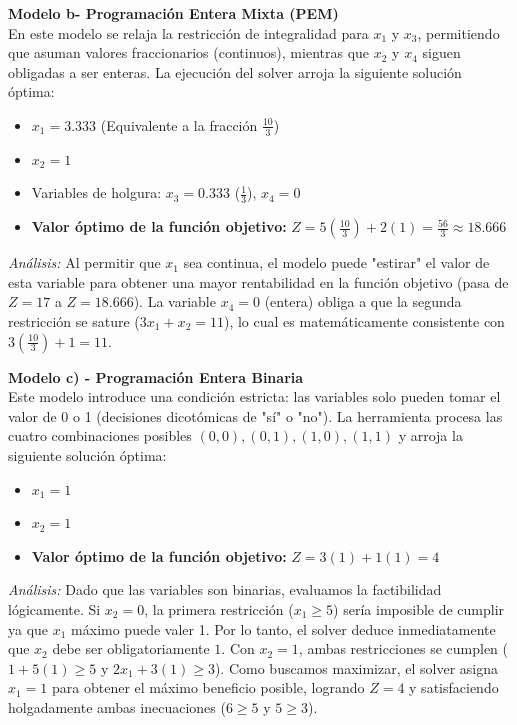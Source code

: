\documentclass[10pt,a4paper]{article}
\begin{document}
\vspace{0.4cm}
\textbf{Modelo b- Programación Entera Mixta (PEM)}\\
En este modelo se relaja la restricción de integralidad para $x_1$ y $x_3$, permitiendo que asuman valores fraccionarios (continuos), mientras que $x_2$ y $x_4$ siguen obligadas a ser enteras. La ejecución del solver arroja la siguiente solución óptima:
\begin{itemize}
    \item $x_1 = 3.333$ (Equivalente a la fracción $\frac{10}{3}$)
    \item $x_2 = 1$
    \item Variables de holgura: $x_3 = 0.333$ ($\frac{1}{3}$), $x_4 = 0$
    \item \textbf{Valor óptimo de la función objetivo:} $Z = 5(\frac{10}{3}) + 2(1) = \frac{56}{3} \approx 18.666$
\end{itemize}
\textit{Análisis:} Al permitir que $x_1$ sea continua, el modelo puede "estirar" el valor de esta variable para obtener una mayor rentabilidad en la función objetivo (pasa de $Z=17$ a $Z=18.666$). La variable $x_4 = 0$ (entera) obliga a que la segunda restricción se sature ($3x_1 + x_2 = 11$), lo cual es matemáticamente consistente con $3(\frac{10}{3}) + 1 = 11$.

\vspace{0.4cm}
\textbf{Modelo c) - Programación Entera Binaria}\\
Este modelo introduce una condición estricta: las variables solo pueden tomar el valor de 0 o 1 (decisiones dicotómicas de "sí" o "no"). La herramienta procesa las cuatro combinaciones posibles $(0,0), (0,1), (1,0), (1,1)$ y arroja la siguiente solución óptima:
\begin{itemize}
    \item $x_1 = 1$
    \item $x_2 = 1$
    \item \textbf{Valor óptimo de la función objetivo:} $Z = 3(1) + 1(1) = 4$
\end{itemize}
\textit{Análisis:} Dado que las variables son binarias, evaluamos la factibilidad lógicamente. 
Si $x_2 = 0$, la primera restricción ($x_1 \ge 5$) sería imposible de cumplir ya que 
$x_1$ máximo puede valer 1. Por lo tanto, el solver deduce inmediatamente que $x_2$ debe ser 
obligatoriamente $1$. Con $x_2=1$, ambas restricciones se 
cumplen ($1 + 5(1) \ge 5$ y $2x_1 + 3(1) \ge 3$). Como buscamos maximizar, 
el solver asigna $x_1 = 1$ para obtener el máximo beneficio posible, logrando $Z=4$ y 
satisfaciendo holgadamente ambas inecuaciones ($6 \ge 5$ y $5 \ge 3$).
\end{document}
